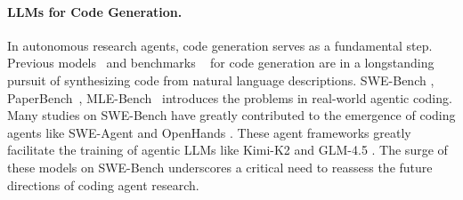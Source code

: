 \paragraph{LLMs for Code Generation.}
In autonomous research agents, code generation serves as a fundamental step. Previous models~\citep{guo2024deepseek, yu2023wavecoder, hui2024qwen2} and benchmarks ~\citep{chen2021evaluating,yu-etal-2025-humaneval} for code generation are in a longstanding pursuit of synthesizing code from natural language descriptions. SWE-Bench \citep{jimenez2024swebench}, PaperBench~\cite{starace2025paperbench}, MLE-Bench~\cite{chan2024mle} introduces the problems in real-world agentic coding. Many studies on SWE-Bench have greatly contributed to the emergence of coding agents like SWE-Agent \citep{yang2024swe} and OpenHands \citep{wang2025openhands}. These agent frameworks greatly facilitate the training of agentic LLMs like Kimi-K2 \citep{team2025kimi} and GLM-4.5 \citep{zeng2025glm}.
The surge of these models on SWE-Bench underscores a critical need to reassess the future directions of coding agent research.



